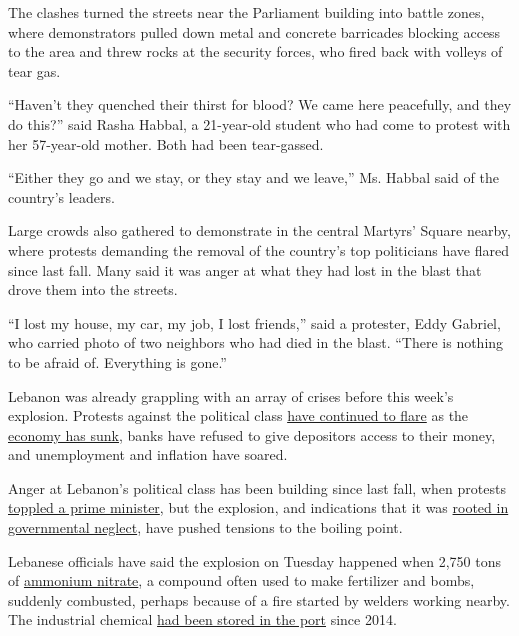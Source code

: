 The clashes turned the streets near the Parliament building into battle
zones, where demonstrators pulled down metal and concrete barricades
blocking access to the area and threw rocks at the security forces, who
fired back with volleys of tear gas.

``Haven't they quenched their thirst for blood? We came here peacefully,
and they do this?'' said Rasha Habbal, a 21-year-old student who had
come to protest with her 57-year-old mother. Both had been tear-gassed.

``Either they go and we stay, or they stay and we leave,'' Ms. Habbal
said of the country's leaders.

Large crowds also gathered to demonstrate in the central Martyrs' Square
nearby, where protests demanding the removal of the country's top
politicians have flared since last fall. Many said it was anger at what
they had lost in the blast that drove them into the streets.

``I lost my house, my car, my job, I lost friends,'' said a protester,
Eddy Gabriel, who carried photo of two neighbors who had died in the
blast. ``There is nothing to be afraid of. Everything is gone.''

Lebanon was already grappling with an array of crises before this week's
explosion. Protests against the political class
\href{https://www.nytimes.com/2020/06/11/world/middleeast/lebanon-protests.html}{have
continued to flare} as the
\href{https://www.nytimes.com/2020/07/12/world/middleeast/beirut-lebanon-economic-crisis.html}{economy
has sunk}, banks have refused to give depositors access to their money,
and unemployment and inflation have soared.

Anger at Lebanon's political class has been building since last fall,
when protests
\href{https://www.nytimes.com/2019/10/29/world/middleeast/saad-hariri-stepping-down-lebanon.html}{toppled
a prime minister}, but the explosion, and indications that it was
\href{https://www.nytimes.com/2020/08/05/world/middleeast/beirut-explosion-lebanon.html}{rooted
in governmental neglect}, have pushed tensions to the boiling point.

Lebanese officials have said the explosion on Tuesday happened when
2,750 tons of
\href{https://www.nytimes.com/2020/08/05/world/middleeast/beirut-explosion-ammonium-nitrate.html}{ammonium
nitrate}, a compound often used to make fertilizer and bombs, suddenly
combusted, perhaps because of a fire started by welders working nearby.
The industrial chemical
\href{https://www.nytimes.com/2020/08/05/world/middleeast/beirut-explosion-ship.html}{had
been stored in the port} since 2014.

